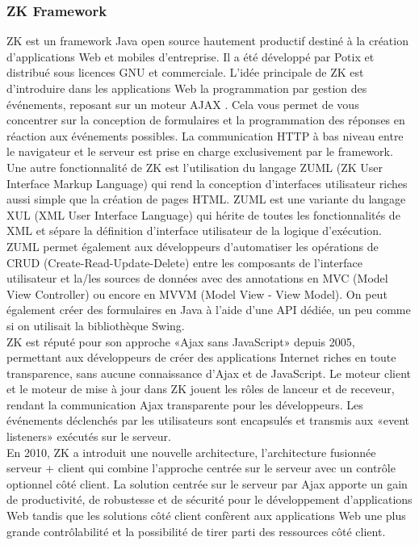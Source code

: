 \subsubsection{ZK Framework}
ZK est un framework Java open source hautement productif destiné à la création d'applications Web et mobiles d'entreprise. Il a été développé par Potix et distribué sous licences GNU et commerciale. L’idée principale de ZK est d’introduire dans les applications Web la programmation par gestion des événements, reposant sur un moteur AJAX \cite {zk}. Cela vous permet de vous concentrer sur la conception de formulaires et la programmation des réponses en réaction aux événements possibles. La communication HTTP à bas niveau entre le navigateur et le serveur est prise en charge exclusivement par le framework.
   \\
Une autre fonctionnalité de ZK est l'utilisation du langage ZUML (ZK User Interface Markup Language) qui rend la conception d'interfaces utilisateur riches aussi simple que la création de pages HTML. ZUML est une variante du langage XUL (XML User Interface Language) qui hérite de toutes les fonctionnalités de XML et sépare la définition d'interface utilisateur de la logique d'exécution. ZUML permet également aux développeurs d'automatiser les opérations de CRUD (Create-Read-Update-Delete) entre les composants de l'interface utilisateur et la/les sources de données avec des annotations en MVC (Model View Controller) ou encore en MVVM (Model View - View Model). On peut également créer des formulaires en Java à l'aide d'une API dédiée, un peu comme si on utilisait la bibliothèque Swing.\\
ZK est réputé pour son approche «Ajax sans JavaScript» depuis 2005, permettant aux développeurs de créer des applications Internet riches en toute transparence, sans aucune connaissance d'Ajax et de JavaScript. Le moteur client et le moteur de mise à jour dans ZK jouent les rôles de lanceur et de receveur, rendant la communication Ajax transparente pour les développeurs. Les événements déclenchés par les utilisateurs sont encapsulés et transmis aux «event listeners» exécutés sur le serveur.\\
En 2010, ZK a introduit une nouvelle architecture, l'architecture fusionnée serveur + client qui combine l'approche centrée sur le serveur avec un contrôle optionnel côté client. La solution centrée sur le serveur par Ajax apporte un gain de productivité, de robustesse et de sécurité pour le développement d'applications Web tandis que les solutions côté client confèrent aux applications Web une plus grande contrôlabilité et la possibilité de tirer parti des ressources côté client. \\
